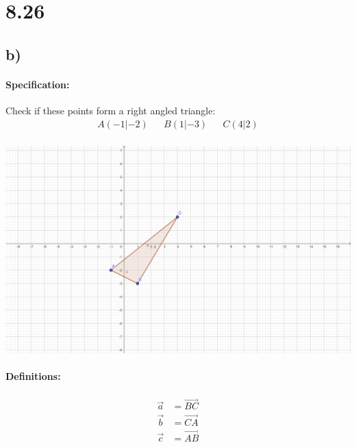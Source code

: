 \documentclass{article}
\begin{document}
\section*{8.26}
\subsection*{b)}
\paragraph{Specification:}
Check if these points form a right angled triangle:
\begin{align*}
    A(-1|-2) &&
    B(1|-3) &&
    C(4|2) \\[20pt]
\end{align*}

\includegraphics[width=\linewidth]{images/8-26-b.png}

\paragraph{Definitions:}
\begin{align*}
    \vec{a} &= \vec{BC} \\
    \vec{b} &= \vec{CA} \\
    \vec{c} &= \vec{AB} \\
\end{align*}
\end{document}
